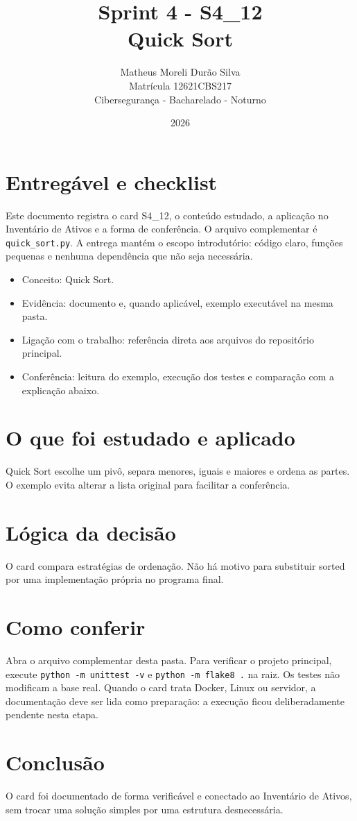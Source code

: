 \documentclass[12pt]{article}
\title{Sprint 4 - S4\_12\\Quick Sort}
\author{Matheus Moreli Durão Silva\\ Matrícula 12621CBS217\\ Cibersegurança - Bacharelado - Noturno}
\date{2026}
\begin{document}
\maketitle

\section*{Entregável e checklist}
Este documento registra o card S4\_12, o conteúdo estudado, a aplicação no Inventário de Ativos e a forma de conferência. O arquivo complementar é \texttt{quick\_sort.py}. A entrega mantém o escopo introdutório: código claro, funções pequenas e nenhuma dependência que não seja necessária.

\begin{itemize}
\item Conceito: Quick Sort.
\item Evidência: documento e, quando aplicável, exemplo executável na mesma pasta.
\item Ligação com o trabalho: referência direta aos arquivos do repositório principal.
\item Conferência: leitura do exemplo, execução dos testes e comparação com a explicação abaixo.
\end{itemize}

\section*{O que foi estudado e aplicado}
Quick Sort escolhe um pivô, separa menores, iguais e maiores e ordena as partes. O exemplo evita alterar a lista original para facilitar a conferência.

\section*{Lógica da decisão}
O card compara estratégias de ordenação. Não há motivo para substituir sorted por uma implementação própria no programa final.

\section*{Como conferir}
Abra o arquivo complementar desta pasta. Para verificar o projeto principal, execute \texttt{python -m unittest -v} e \texttt{python -m flake8 .} na raiz. Os testes não modificam a base real. Quando o card trata Docker, Linux ou servidor, a documentação deve ser lida como preparação: a execução ficou deliberadamente pendente nesta etapa.

\section*{Conclusão}
O card foi documentado de forma verificável e conectado ao Inventário de Ativos, sem trocar uma solução simples por uma estrutura desnecessária.
\end{document}
